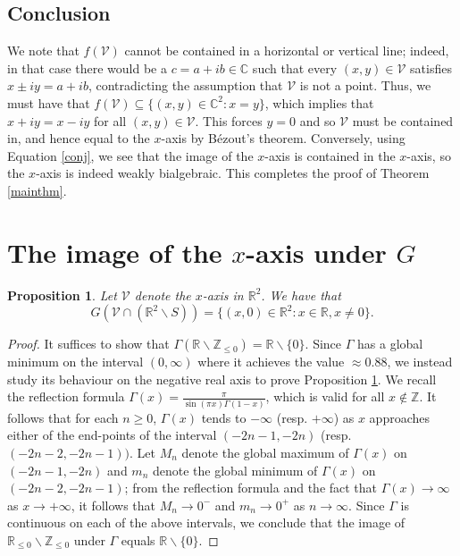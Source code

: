 \documentclass[11pt,reqno]{amsart}
\newtheorem{proposition}[theorem]{Proposition}
\theoremstyle{definition}
\numberwithin{equation}{section}
\newcommand{\cV}{\mathcal{V}}
\begin{document}
\subsection{Conclusion} We note that $f(\mathcal V)$ cannot be contained in a horizontal or vertical line; indeed, in that case there would be a $c =a+i b \in \mathbb C$ such that  every $(x, y) \in \mathcal V$ satisfies $x \pm iy=a+ib$, contradicting the assumption that $\mathcal V$ is not a point. Thus, we must have that $f(\mathcal V) \subseteq \{(x, y) \in \mathbb C^2: x=y\}$, which implies that $x+iy=x-iy$ for all $(x, y) \in \mathcal V$. This forces $y=0$ and so $\mathcal V$ must be contained in, and hence equal to the $x$-axis by Bézout's theorem. 
Conversely, using Equation \eqref{conj}, we see that the image of the $x$-axis is contained in the $x$-axis, so the $x$-axis is indeed weakly bialgebraic. This completes the proof of Theorem \ref{mainthm}. 


\section{The image of the $x$-axis under $G$}


\begin{proposition} \label{complete}
Let $\mathcal V$ denote the $x$-axis in $\mathbb R^2$. We have that 
$$G(\cV \cap ( \mathbb R^2  \smallsetminus S)) = \{ (x, 0) \in \mathbb R^2: x \in \mathbb R,  x \neq 0\}.$$
\end{proposition}

\begin{proof}
It suffices to show that $\Gamma(\mathbb R \smallsetminus \mathbb Z_{\leq 0})=\mathbb R \smallsetminus \{0\} $. %
Since $\Gamma$ has a global minimum on the interval $(0, \infty)$ where it achieves the value $\approx 0.88 $, we instead study its behaviour on the negative real axis to prove Proposition \ref{complete}. %
We recall the reflection formula $\Gamma(x)=\frac{\pi}{\sin(\pi x)\Gamma(1-x)}$, which is valid for all $x \not \in \mathbb Z$. It follows that for each $n \geq 0$, $\Gamma(x)$ tends to $-\infty$ (resp. $+\infty$)  as $x$ approaches either of the end-points of the interval $(-2n-1, -2n)$ (resp. $(-2n-2, -2n-1))$.  Let $M_n$ denote the global maximum  of $\Gamma(x)$ on $(-2n-1, -2n)$ and $m_n$ denote the global minimum of $\Gamma(x)$ on  $(-2n-2, -2n-1)$; from the reflection formula and the fact that $\Gamma(x) \to  \infty$ as $x \to + \infty$, it follows that $M_n \to 0^{-}$ and $m_n \to 0^+$ as $n \to \infty$. Since $\Gamma$ is continuous on each of the above intervals,  we conclude that the image of $\mathbb R_{\leq 0} \smallsetminus \mathbb Z_{\leq 0}$ under $\Gamma$ equals $\mathbb R \smallsetminus \{0\}$. 
\end{proof}
\end{document}
